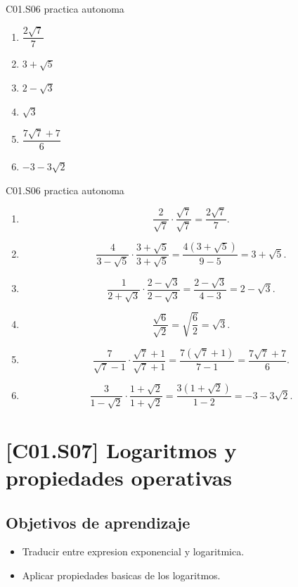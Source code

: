 \begin{shortanswer}{C01.S06 practica autonoma}
\begin{enumerate}[label=\textbf{PX-C01.S06-\arabic*:}, leftmargin=*]
  \item \(\dfrac{2\sqrt{7}}{7}\)
  \item \(3+\sqrt{5}\)
  \item \(2-\sqrt{3}\)
  \item \(\sqrt{3}\)
  \item \(\dfrac{7\sqrt{7}+7}{6}\)
  \item \(-3-3\sqrt{2}\)
\end{enumerate}
\end{shortanswer}

\begin{fullsolution}{C01.S06 practica autonoma}
\begin{enumerate}[label=\textbf{PX-C01.S06-\arabic*:}, leftmargin=*]
  \item
  \[
  \frac{2}{\sqrt{7}}\cdot\frac{\sqrt{7}}{\sqrt{7}}=\frac{2\sqrt{7}}{7}.
  \]
  \item
  \[
  \frac{4}{3-\sqrt{5}}\cdot\frac{3+\sqrt{5}}{3+\sqrt{5}}
  =\frac{4(3+\sqrt{5})}{9-5}=3+\sqrt{5}.
  \]
  \item
  \[
  \frac{1}{2+\sqrt{3}}\cdot\frac{2-\sqrt{3}}{2-\sqrt{3}}
  =\frac{2-\sqrt{3}}{4-3}=2-\sqrt{3}.
  \]
  \item
  \[
  \frac{\sqrt{6}}{\sqrt{2}}=\sqrt{\frac{6}{2}}=\sqrt{3}.
  \]
  \item
  \[
  \frac{7}{\sqrt{7}-1}\cdot\frac{\sqrt{7}+1}{\sqrt{7}+1}
  =\frac{7(\sqrt{7}+1)}{7-1}
  =\frac{7\sqrt{7}+7}{6}.
  \]
  \item
  \[
  \frac{3}{1-\sqrt{2}}\cdot\frac{1+\sqrt{2}}{1+\sqrt{2}}
  =\frac{3(1+\sqrt{2})}{1-2}
  =-3-3\sqrt{2}.
  \]
\end{enumerate}
\end{fullsolution}

\section{[C01.S07] Logaritmos y propiedades operativas}

\subsection*{Objetivos de aprendizaje}
\begin{itemize}
  \item Traducir entre expresion exponencial y logaritmica.
  \item Aplicar propiedades basicas de los logaritmos.
\end{itemize}

